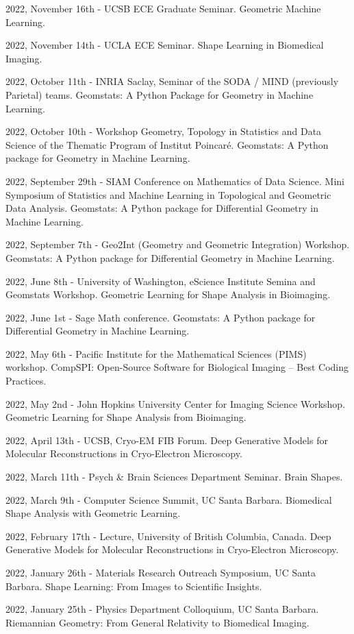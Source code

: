 2022, November 16th - UCSB ECE Graduate Seminar. Geometric Machine Learning.

2022, November 14th - UCLA ECE Seminar. Shape Learning in Biomedical Imaging.

2022, October 11th - INRIA Saclay, Seminar of the SODA / MIND (previously Parietal) teams. Geomstats: A Python Package for Geometry in Machine Learning.

2022, October 10th - Workshop Geometry, Topology in Statistics and Data Science of the Thematic Program of Institut Poincaré. Geomstats: A Python package for Geometry in Machine Learning.

2022, September 29th - SIAM Conference on Mathematics of Data Science. Mini Symposium of Statistics and Machine Learning in Topological and Geometric Data Analysis. Geomstats: A Python package for Differential Geometry in Machine Learning.

2022, September 7th - Geo2Int (Geometry and Geometric Integration) Workshop. Geomstats: A Python package for Differential Geometry in Machine Learning.

2022, June 8th - University of Washington, eScience Institute Semina and Geomstats Workshop. Geometric Learning for Shape Analysis in Bioimaging.

2022, June 1st - Sage Math conference. Geomstats: A Python package for Differential Geometry in Machine Learning.

2022, May 6th - Pacific Institute for the Mathematical Sciences (PIMS) workshop. CompSPI: Open-Source Software for Biological Imaging – Best Coding Practices.

2022, May 2nd - John Hopkins University Center for Imaging Science Workshop. Geometric Learning for Shape Analysis from Bioimaging. 

2022, April 13th - UCSB, Cryo-EM FIB Forum. Deep Generative Models for Molecular Reconstructions in Cryo-Electron Microscopy.

2022, March 11th - Psych \& Brain Sciences Department Seminar. Brain Shapes.

2022, March 9th - Computer Science Summit, UC Santa Barbara. Biomedical Shape Analysis with Geometric Learning.

2022, February 17th - Lecture, University of British Columbia, Canada. Deep Generative Models for Molecular Reconstructions in Cryo-Electron Microscopy.

2022, January 26th - Materials Research Outreach Symposium, UC Santa Barbara. Shape Learning: From Images to Scientific Insights.

2022, January 25th - Physics Department Colloquium, UC Santa Barbara. Riemannian Geometry: From General Relativity to Biomedical Imaging.